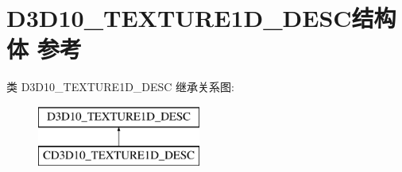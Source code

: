 \hypertarget{struct_d3_d10___t_e_x_t_u_r_e1_d___d_e_s_c}{}\section{D3\+D10\+\_\+\+T\+E\+X\+T\+U\+R\+E1\+D\+\_\+\+D\+E\+S\+C结构体 参考}
\label{struct_d3_d10___t_e_x_t_u_r_e1_d___d_e_s_c}
类 D3\+D10\+\_\+\+T\+E\+X\+T\+U\+R\+E1\+D\+\_\+\+D\+E\+SC 继承关系图\+:\begin{figure}[H]
\begin{center}
\leavevmode
\includegraphics[height=2.000000cm]{struct_d3_d10___t_e_x_t_u_r_e1_d___d_e_s_c}
\end{center}
\end{figure}
